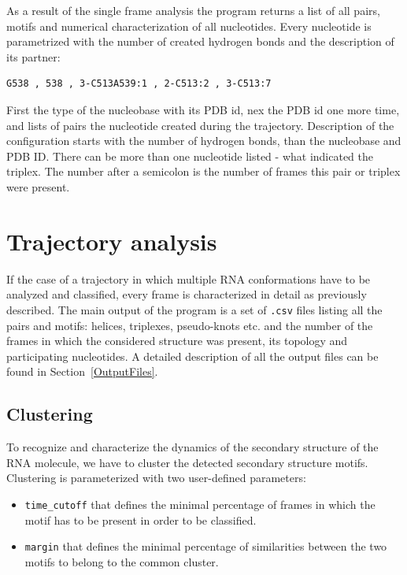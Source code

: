 \documentclass[12pt]{article}
\begin{document}
As a result of the single frame analysis the program returns a list of all pairs, motifs and numerical characterization of all nucleotides. Every nucleotide is parametrized with the number of created hydrogen bonds and the description of its partner:

\begin{verbatim}
G538 , 538 , 3-C513A539:1 , 2-C513:2 , 3-C513:7
\end{verbatim}

First the type of the nucleobase with its PDB id, nex the PDB id one more time, and lists of pairs the nucleotide created during the trajectory. Description of the configuration starts with the number of hydrogen bonds, than the nucleobase and PDB ID. There can be more than one nucleotide listed - what indicated the triplex. The number after a semicolon is the number of frames this pair or triplex were present.

\newpage
\section{Trajectory analysis}
If the case of a trajectory in which multiple RNA conformations have to be analyzed and classified, every frame is characterized in detail as previously described. The main output of the program is a set of \texttt{.csv} files listing all the pairs and motifs: helices, triplexes, pseudo-knots etc. and the number of the frames in which the considered structure was present, its topology and participating nucleotides. A detailed description of all the output files can be found in Section~\ref{OutputFiles}.

\subsection{Clustering}
To recognize and characterize the dynamics of the secondary structure of the RNA molecule, we have to cluster the detected secondary structure motifs. Clustering is parameterized with two user-defined parameters: \\
\begin{itemize}
\item \texttt{time\_cutoff} that defines the minimal percentage of frames in which the motif has to be present in order to be classified.
\item \texttt{margin} that defines the minimal percentage of similarities between the two motifs to belong to the common cluster. 
\end{itemize}
\end{document}
